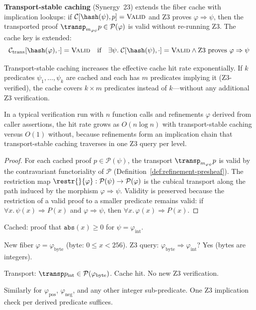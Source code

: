 \begin{definition}
\label{def:transport-cache}
\textbf{Transport-stable caching} (Synergy~23) extends the fiber cache with
implication lookups: if $\mathcal{C}[\hash(\psi), p] = \textsc{Valid}$
and Z3 proves $\varphi \Rightarrow \psi$, then the transported proof
$\transp_{m_{\varphi\psi}} p \in \mathcal{P}(\varphi)$ is valid without
re-running Z3.  The cache key is extended:
\[
  \mathcal{C}_{\mathrm{trans}}[\hash(\varphi), \cdot] =
  \textsc{Valid}
  \quad\text{if}\quad
  \exists \psi.\;
  \mathcal{C}[\hash(\psi), \cdot] = \textsc{Valid}
  \wedge
  \text{Z3 proves } \varphi \Rightarrow \psi
\]
\end{definition}

\begin{proposition}
\label{prop:cache-amplification}
Transport-stable caching increases the effective cache hit rate
exponentially.  If $k$ predicates $\psi_1, \ldots, \psi_k$ are cached
and each has $m$ predicates implying it (Z3-verified), the cache covers
$k \times m$ predicates instead of $k$---without any additional Z3
verification.

In a typical verification run with $n$ function calls and refinements
$\varphi$ derived from caller assertions, the hit rate grows as $O(n \log
n)$ with transport-stable caching versus $O(1)$ without, because
refinements form an implication chain that transport-stable caching
traverses in one Z3 query per level.
\end{proposition}

\begin{proof}
For each cached proof $p \in \mathcal{P}(\psi)$, the transport
$\transp_{m_{\varphi\psi}} p$ is valid by the contravariant functoriality
of $\mathcal{P}$ (Definition~\ref{def:refinement-presheaf}).  The
restriction map $\restr{}{\varphi} : \mathcal{P}(\psi) \to
\mathcal{P}(\varphi)$ is the cubical transport along the path
induced by the morphism $\varphi \Rightarrow \psi$.  Validity is preserved
because the restriction of a valid proof to a smaller predicate remains
valid: if $\forall x.\,\psi(x) \Rightarrow P(x)$ and $\varphi \Rightarrow
\psi$, then $\forall x.\,\varphi(x) \Rightarrow P(x)$.
\end{proof}

\begin{example}
\label{ex:transport-cache}
Cached: proof that $\mathtt{abs}(x) \ge 0$ for $\psi = \varphi_{\mathrm{int}}$.

New fiber $\varphi = \varphi_{\mathrm{byte}}$ (byte: $0 \le x < 256$).
Z3 query: $\varphi_{\mathrm{byte}} \Rightarrow \varphi_{\mathrm{int}}$?
Yes (bytes are integers).

Transport: $\transp p_{\mathrm{int}} \in \mathcal{P}(\varphi_{\mathrm{byte}})$.
Cache hit.  No new Z3 verification.

Similarly for $\varphi_{\mathrm{pos}}$, $\varphi_{\mathrm{neg}}$, and any
other integer sub-predicate.  One Z3 implication check per derived
predicate suffices.
\end{example}


